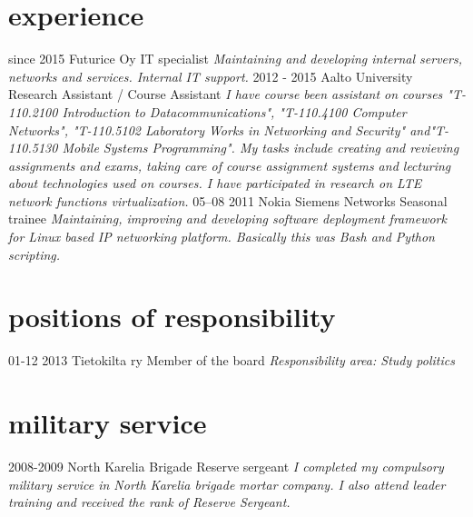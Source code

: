 \documentclass[]{friggeri-cv}
\begin{document}
\section{experience}

\begin{entrylist}
  \entry
    {since 2015}
    {Futurice Oy}
    {IT specialist}
    {\emph{Maintaining and developing internal servers, networks and services. Internal IT support.}}
  \entry
    {2012 - 2015}
    {Aalto University}
    {Research Assistant / Course Assistant}
    {\emph{I have course been assistant on courses "T-110.2100 Introduction to Datacommunications", "T-110.4100 Computer Networks", "T-110.5102 Laboratory Works in Networking and Security" and"T-110.5130 Mobile Systems Programming". My tasks include creating and revieving assignments and exams, taking care of course assignment systems and lecturing about technologies used on courses. I have participated in research on LTE network functions virtualization.}}
  \entry
    {05–08 2011}
    {Nokia Siemens Networks}
    {Seasonal trainee}
    {\emph{Maintaining, improving and developing software deployment framework for Linux based IP networking platform. Basically this was Bash and Python scripting.}}
\end{entrylist}

\section{positions of responsibility}
  \begin{entrylist}
    \entry
      {01-12 2013}
      {Tietokilta ry}
      {Member of the board}
      {\emph{Responsibility area: Study politics}}
  \end{entrylist}

\section{military service}
  \begin{entrylist}
    \entry
      {2008-2009}
      {North Karelia Brigade}
      {Reserve sergeant}
      {\emph{I completed my compulsory military service in North Karelia brigade mortar company. I also attend leader training and received the rank of Reserve Sergeant.}}
  \end{entrylist}
\end{document}
